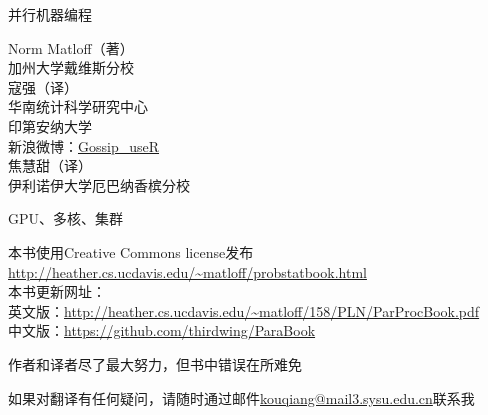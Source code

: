 \pagecolor{yellow}
\color{black}

\bigskip
\vspace{0.5in}
\bigskip
\begin{center}
{\Huge 并行机器编程}

{\LARGE Norm Matloff（著）\\
加州大学戴维斯分校\\
\bigskip
寇强（译）\\
\vspace{1 mm}
华南统计科学研究中心\\
\vspace{1 mm}
印第安纳大学\\
\vspace{1 mm}
新浪微博：\href{http://www.weibo.com/thirdwing}{Gossip\_useR}\\
\vspace{3 mm}
焦慧甜（译）\\
\vspace{1 mm}
伊利诺伊大学厄巴纳香槟分校\\
\vspace{3 mm}
}





\bigskip

\vspace{0.5in}

{\LARGE GPU、多核、集群}
\end{center}
\vspace{1in}



\vspace{1.5in}
\noindent 本书使用Creative Commons license发布\\
\url{http://heather.cs.ucdavis.edu/~matloff/probstatbook.html}\\
\medskip
\noindent 本书更新网址：\\
英文版：\url{http://heather.cs.ucdavis.edu/~matloff/158/PLN/ParProcBook.pdf}\\
中文版：\url{https://github.com/thirdwing/ParaBook}

\medskip
\noindent 作者和译者尽了最大努力，但书中错误在所难免

\noindent 如果对翻译有任何疑问，请随时通过邮件\href{mailto:kouqiang@mail3.sysu.edu.cn}{kouqiang@mail3.sysu.edu.cn}联系我
\newpage
